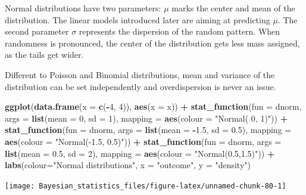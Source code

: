 \documentclass[]{svmono}
\newenvironment{Shaded}{\begin{snugshade}}{\end{snugshade}}
\newcommand{\KeywordTok}[1]{\textcolor[rgb]{0.13,0.29,0.53}{\textbf{#1}}}
\newcommand{\DataTypeTok}[1]{\textcolor[rgb]{0.13,0.29,0.53}{#1}}
\newcommand{\DecValTok}[1]{\textcolor[rgb]{0.00,0.00,0.81}{#1}}
\newcommand{\FloatTok}[1]{\textcolor[rgb]{0.00,0.00,0.81}{#1}}
\newcommand{\StringTok}[1]{\textcolor[rgb]{0.31,0.60,0.02}{#1}}
\newcommand{\OperatorTok}[1]{\textcolor[rgb]{0.81,0.36,0.00}{\textbf{#1}}}
\newcommand{\NormalTok}[1]{#1}
\begin{document}
Normal distributions have two parameters: \(\mu\) marks the center and
mean of the distribution. The linear models introduced later are aiming
at predicting \(\mu\). The second parameter \(\sigma\) represents the
dispersion of the random pattern. When randomness is pronounced, the
center of the distribution gets less mass assigned, as the tails get
wider.

Different to Poisson and Binomial distributions, mean and variance of
the distribution can be set independently and overdispersion is never an
issue.

\begin{Shaded}
\begin{Highlighting}[]
\KeywordTok{ggplot}\NormalTok{(}\KeywordTok{data.frame}\NormalTok{(}\DataTypeTok{x =} \KeywordTok{c}\NormalTok{(}\OperatorTok{-}\DecValTok{4}\NormalTok{, }\DecValTok{4}\NormalTok{)), }\KeywordTok{aes}\NormalTok{(}\DataTypeTok{x =}\NormalTok{ x)) }\OperatorTok{+}
\StringTok{  }\KeywordTok{stat_function}\NormalTok{(}\DataTypeTok{fun =}\NormalTok{ dnorm, }\DataTypeTok{args =} \KeywordTok{list}\NormalTok{(}\DataTypeTok{mean =} \DecValTok{0}\NormalTok{, }\DataTypeTok{sd =} \DecValTok{1}\NormalTok{), }\DataTypeTok{mapping =} \KeywordTok{aes}\NormalTok{(}\DataTypeTok{colour =} \StringTok{"Normal( 0, 1)"}\NormalTok{)) }\OperatorTok{+}
\StringTok{  }\KeywordTok{stat_function}\NormalTok{(}\DataTypeTok{fun =}\NormalTok{ dnorm, }\DataTypeTok{args =} \KeywordTok{list}\NormalTok{(}\DataTypeTok{mean =} \OperatorTok{-}\FloatTok{1.5}\NormalTok{, }\DataTypeTok{sd =} \FloatTok{0.5}\NormalTok{), }\DataTypeTok{mapping =} \KeywordTok{aes}\NormalTok{(}\DataTypeTok{colour =} \StringTok{"Normal(-1.5, 0.5)"}\NormalTok{)) }\OperatorTok{+}
\StringTok{  }\KeywordTok{stat_function}\NormalTok{(}\DataTypeTok{fun =}\NormalTok{ dnorm, }\DataTypeTok{args =} \KeywordTok{list}\NormalTok{(}\DataTypeTok{mean =} \FloatTok{0.5}\NormalTok{, }\DataTypeTok{sd =} \DecValTok{2}\NormalTok{), }\DataTypeTok{mapping =} \KeywordTok{aes}\NormalTok{(}\DataTypeTok{colour =} \StringTok{"Normal(0.5,1.5)"}\NormalTok{)) }\OperatorTok{+}
\StringTok{  }\KeywordTok{labs}\NormalTok{(}\DataTypeTok{colour=}\StringTok{"Normal distributions"}\NormalTok{, }\DataTypeTok{x =} \StringTok{"outcome"}\NormalTok{, }\DataTypeTok{y =} \StringTok{"density"}\NormalTok{)}
\end{Highlighting}
\end{Shaded}

\texttt{[image: Bayesian\_statistics\_files/figure-latex/unnamed-chunk-80-1]}
\end{document}
